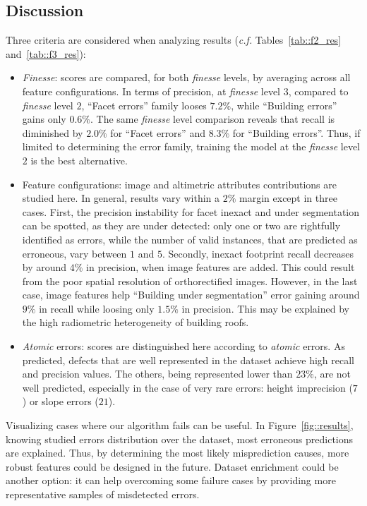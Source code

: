 \documentclass[runningheads]{llncs}
\begin{document}
\subsection{Discussion}

Three criteria are considered when analyzing results (\textit{c.f.} Tables~\ref{tab::f2_res} and~\ref{tab::f3_res}):
\begin{itemize}
	\item \textit{Finesse}: scores are compared, for both \textit{finesse} levels, by averaging across all feature configurations. In terms of precision, at \textit{finesse} level $3$, compared to \textit{finesse} level $2$, ``Facet errors'' family looses $7.2\%$, while ``Building errors'' gains only $0.6\%$. The same \textit{finesse} level comparison reveals that recall is diminished by $2.0\%$ for ``Facet errors'' and $8.3\%$ for ``Building errors''. Thus, if limited to determining the error family, training the model at the \textit{finesse} level $2$ is the best alternative.
    \item Feature configurations: image and altimetric attributes contributions are studied here. In general, results vary within a $2\%$ margin except in three cases. First, the precision instability for facet inexact and under segmentation can be spotted, as they are under detected: only one or two are rightfully identified as errors, while the number of valid instances, that are predicted as erroneous, vary between $1$ and $5$. Secondly, inexact footprint recall decreases by around $4\%$ in precision, when image features are added. This could result from the poor spatial resolution of orthorectified images. However, in the last case, image features help ``Building under segmentation'' error gaining around $9\%$ in recall while loosing only $1.5\%$ in precision. This may be explained by the high radiometric heterogeneity of building roofs.
    \item \textit{Atomic} errors: scores are distinguished here according to \textit{atomic} errors. As predicted, defects that are well represented in the dataset achieve high recall and precision values. The others, being represented lower than $23\%$, are not well predicted, especially in the case of very rare errors: height imprecision ($7$) or slope errors ($21$).
\end{itemize}

Visualizing cases where our algorithm fails can be useful. In Figure~\ref{fig::results}, knowing studied errors distribution over the dataset, most erroneous predictions are explained. Thus, by determining the most likely misprediction causes, more robust features could be designed in the future. Dataset enrichment could be another option: it can help overcoming some failure cases by providing more representative samples of misdetected errors.
\end{document}
